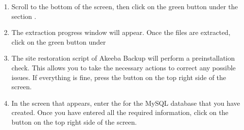 \documentclass[a4paper,10pt,english,openany,oneside]{sphinxmanual}
\begin{document}
\begin{enumerate}
\begin{figure}[H]
\centering

\noindent{}
\end{figure}

\newpage

\item {} 
\sphinxAtStartPar
Scroll to the bottom of the screen, then click on the  green button under the section .

\begin{figure}[H]
\centering

\noindent{}
\end{figure}

\item {} 
\sphinxAtStartPar
The extraction progress window will appear. Once the files are extracted, click on the green button  under 

\begin{figure}[H]
\centering

\noindent{}
\end{figure}

\item {} 
\sphinxAtStartPar
The site restoration script of Akeeba Backup will perform a pre\sphinxhyphen{}installation check. This allows you to take the necessary actions to correct any possible issues. If everything is fine, press the button  on the top right side of the screen.

\begin{figure}[H]
\centering

\noindent{}
\end{figure}

\newpage

\item {} 
\sphinxAtStartPar
In the screen that appears, enter the {\hyperref[\detokenize{joomla-to-vps:credentials}]{}} for the MySQL database that you have created. Once you have entered all the required information, click on the button  on the top right side of the screen.

\begin{figure}[H]
\centering


\end{figure}
\end{enumerate}
\end{document}
